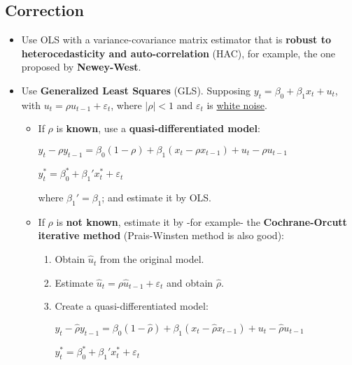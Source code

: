 \documentclass[10pt, a4paper, landscape]{article}
\begin{document}
\begin{multicols}{3}
		\subsection*{Correction}
		
		\begin{itemize}[leftmargin=*]
			\item Use OLS with a variance-covariance matrix estimator that is \textbf{robust to heterocedasticity and auto-correlation} (HAC), for example, the one proposed by \textbf{Newey-West}.
			\item Use \textbf{Generalized Least Squares} (GLS). Supposing $y_{t} = \beta_{0} + \beta_{1} x_{t} + u_{t}$, with $u_{t} = \rho u_{t - 1}+ \varepsilon_{t}$, where $\lvert \rho \rvert < 1$ and $\varepsilon_{t}$ is \underline{white noise}.
			
			\begin{itemize}[leftmargin=*]
				\item If $\rho$ is \textbf{known}, use a \textbf{quasi-differentiated model}:
			
				\begin{center}
					$y_{t} - \rho y_{t - 1}= \beta_{0} (1 - \rho) + \beta_{1} (x_{t} - \rho x_{t - 1}) + u_{t} - \rho u_{t - 1}$
					
					$y_{t}^{*} = \beta_{0}^{*} + \beta_{1}' x_{t}^{*} + \varepsilon_{t}$
				\end{center}
				
				where $\beta_{1}' = \beta_{1}$; and estimate it by OLS.
				
				\item If $\rho$ is \textbf{not known}, estimate it by -for example- the \textbf{Cochrane-Orcutt iterative method} (Prais-Winsten method is also good):
				
				\begin{enumerate}[leftmargin=*]
					\item Obtain $\hat{u}_{t}$ from the original model.
					\item Estimate $\hat{u}_{t} = \rho \hat{u}_{t-1} + \varepsilon_{t}$ and obtain $\hat{\rho}$.
					\item Create a quasi-differentiated model:
					
					\begin{center}
						$y_{t} - \hat{\rho}y_{t - 1} = \beta_{0} (1 - \hat{\rho}) + \beta_{1} (x_{t} - \hat{\rho} x_{t - 1}) + u_{t} - \hat{\rho}u_{t - 1}$
						
						$y_{t}^{*} = \beta_{0}^{*} + \beta_{1}' x_{t}^{*} + \varepsilon_{t}$
					\end{center}
					

\end{enumerate}
\end{itemize}
\end{itemize}
\end{multicols}
\end{document}
